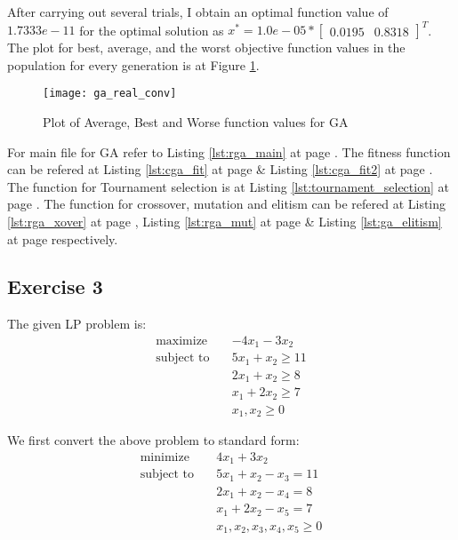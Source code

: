 \documentclass[11pt]{article}
\newcommand{\mat}[1]{\begin{bmatrix}#1\end{bmatrix}}
\newcommand{\reflst}[1]{Listing \ref{#1} at page \pageref{#1}}
\newcommand{\reffig}[1]{Figure \ref{#1}}
\begin{document}
\noindent After carrying out several trials, I obtain an optimal function value of $1.7333e-11$ for the optimal solution as
$x^* = 1.0e-05*\mat{0.0195&    0.8318}^T$. The plot for best, average, and the worst objective function values in the population for every generation is at \reffig{fig:ga_real_conv}.

\begin{figure}[!h]
 \centering
 \texttt{[image: ga\_real\_conv]}
 \caption{Plot of Average, Best and Worse function values for GA}
 \label{fig:ga_real_conv}
\end{figure}

\noindent For main file for GA refer to \reflst{lst:rga_main}. The fitness function can be refered at \reflst{lst:cga_fit} \&  \reflst{lst:cga_fit2}. The function for Tournament selection is at \reflst{lst:tournament_selection}. The function for crossover, mutation and elitism can be refered at \reflst{lst:rga_xover}, \reflst{lst:rga_mut} \& \reflst{lst:ga_elitism} respectively.

%
\clearpage
\vspace{2ex}
%
\subsection*{Exercise 3}
The given LP problem is:
\begin{align*}
 \text{maximize} \quad& -4x_1 -3x_2\\
 \text{subject to} \quad& 5x_1 +x_2 \geq 11\\
 & 2x_1 +x_2 \geq 8\\
 & x_1 + 2x_2 \geq 7\\
 & x_1,x_2 \geq 0
\end{align*}

\noindent We first convert the above problem to standard form:
\begin{align*}
 \text{minimize} \quad& 4x_1 +3x_2\\
 \text{subject to} \quad& 5x_1 +x_2 - x_3=  11\\
 & 2x_1 +x_2 -x_4 = 8\\
 & x_1 + 2x_2 -x_5 = 7\\
 & x_1,x_2,x_3,x_4,x_5 \geq 0
\end{align*}
\end{document}
